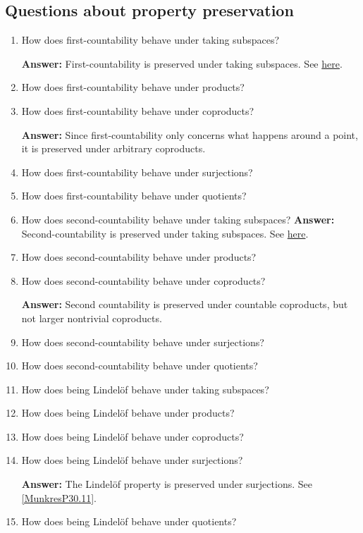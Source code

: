 \subsection{Questions about property preservation}
\begin{enumerate}
    \item How does first-countability behave under taking subspaces?

    \textbf{Answer: } First-countability is preserved under taking subspaces. See \hyperlink{FirstSecondCountabilityHereditary}{here}.
    \item How does first-countability behave under products?
    \item How does first-countability behave under coproducts?

    \textbf{Answer: } Since first-countability only concerns what happens around a point, it is preserved under arbitrary coproducts.
    \item How does first-countability behave under surjections?
    \item How does first-countability behave under quotients?
    \item How does second-countability behave under taking subspaces?
    \textbf{Answer: } Second-countability is preserved under taking subspaces. See \hyperlink{FirstSecondCountabilityHereditary}{here}.
    \item How does second-countability behave under products?
    \item How does second-countability behave under coproducts?

    \textbf{Answer: } Second countability is preserved under countable coproducts, but not larger nontrivial coproducts.
    \item How does second-countability behave under surjections?
    \item How does second-countability behave under quotients?
    \item How does being Lindel\"of behave under taking subspaces?
    \item How does being Lindel\"of behave under products?
    \item How does being Lindel\"of behave under coproducts?
    \item How does being Lindel\"of behave under surjections?

    \textbf{Answer: } The Lindel\"of property is preserved under surjections. See \ref{MunkresP30.11}.
    \item How does being Lindel\"of behave under quotients?


\end{enumerate}
